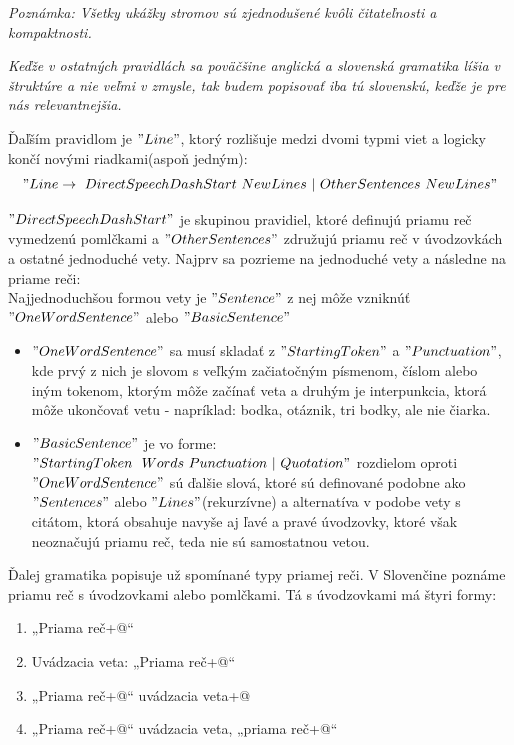 \documentclass[12pt,a4paper]{report}
\theoremstyle{definition}
\theoremstyle{remark}
\begin{document}
\textit{Poznámka: Všetky ukážky stromov sú zjednodušené kvôli čitateľnosti a kompaktnosti.}


\textit{Keďže v ostatných pravidlách sa poväčšine anglická a slovenská gramatika líšia v štruktúre a nie veľmi v zmysle, tak budem popisovať iba tú slovenskú, keďže je pre nás relevantnejšia.} 

Ďaľším pravidlom je $"Line"$, ktorý rozlišuje medzi dvomi typmi viet a logicky končí novými riadkami(aspoň jedným):
$$"Line \to \ DirectSpeechDashStart \ NewLines \ | \ OtherSentences \ NewLines "$$

\noindent $"DirectSpeechDashStart"$ je skupinou pravidiel, ktoré definujú priamu reč vymedzenú pomlčkami a $"OtherSentences"$ združujú priamu reč v úvodzovkách a ostatné jednoduché vety. Najprv sa pozrieme na jednoduché vety a následne na priame reči: \\


 Najjednoduchšou formou vety je $"Sentence"$ z nej môže vzniknúť \\ $"OneWordSentence"$ alebo $"BasicSentence"$
\begin{itemize}
\item $"OneWordSentence"$ sa musí skladať z $"StartingToken"$ a $"Punctuation"$, kde prvý z nich je slovom s veľkým začiatočným písmenom, číslom alebo iným tokenom, ktorým môže začínať veta a druhým je interpunkcia, ktorá môže ukončovať vetu - napríklad: bodka, otáznik, tri bodky, ale nie čiarka.
\item $"BasicSentence"$ je vo forme: $"StartingToken \ \ Words \ Punctuation \ | \ Quotation"$
	rozdielom oproti $"OneWordSentence"$ sú ďalšie slová, ktoré sú definované podobne ako $"Sentences"$ alebo $"Lines"$(rekurzívne) a alternatíva v podobe vety s citátom, ktorá obsahuje navyše aj ľavé a pravé úvodzovky, ktoré však neoznačujú priamu reč, teda nie sú samostatnou vetou.
\end{itemize}

Ďalej gramatika popisuje už spomínané typy priamej reči. V Slovenčine poznáme priamu reč s úvodzovkami  alebo pomlčkami. Tá s úvodzovkami má štyri formy:
\begin{enumerate}[leftmargin=*]
\item „Priama reč\verb@[.?!]+@“
\item Uvádzacia veta: „Priama reč\verb@[.?!]+@“
\item „Priama reč\verb@[,?!]+@“ uvádzacia veta\verb@[.?!]+@
\item „Priama reč\verb@[,?!]+@“ uvádzacia veta, „priama reč\verb@[.?!]+@“
\end{enumerate}
\end{document}
